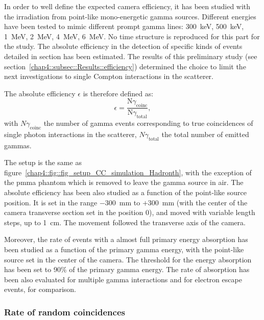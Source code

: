 In order to well define the expected camera efficiency, it has been studied with the irradiation from point-like mono-energetic gamma sources. Different energies have been tested to mimic different prompt gamma lines: 300~keV, 500~keV, 1~MeV, 2~MeV, 4~MeV, 6~MeV. No time structure is reproduced for this part for the study.
The absolute efficiency in the detection of specific kinds of events detailed in section has been estimated. The results of this preliminary study (see section~\ref{chap4::subsec::Results::efficiency}) determined the choice to limit the next investigations to single Compton interactions in the scatterer.

The absolute efficiency $\epsilon$ is therefore defined as:
\begin{equation}
\epsilon =\frac{\mathrm{N}\gamma_{\mathrm{coinc}}}{\mathrm{N}\gamma_{\mathrm{total}}},
\end{equation}
\label{chap4::eq::equation_absEff}
with $N\gamma_{\mathrm{coinc}}$ the number of gamma events corresponding to true coincidences of single photon interactions in the scatterer, $N\gamma_{\mathrm{total}}$ the total number of emitted gammas.

The setup is the same as figure~\ref{chap4::fig::fig_setup_CC_simulation_Hadronth}, with the exception of the \gls{pmma} phantom which is removed to leave the gamma source in air. The absolute efficiency has been also studied as a function of the point-like source position. It is set in the range $-300$~mm to $+300$~mm (with the center of the camera transverse section set in the position 0), and moved with variable length steps, up to 1~cm. The movement followed the transverse axis of the camera. 

Moreover, the rate of events with a almost full primary energy absorption has been studied as a function of the primary gamma energy, with the point-like source set in the center of the camera. The threshold for the energy absorption has been set to 90\% of the primary gamma energy. The rate of absorption has been also evaluated for multiple gamma interactions and for electron escape events, for comparison. \\ 

\subsubsection{Rate of random coincidences}\label{chap4::subsubsec::random}

